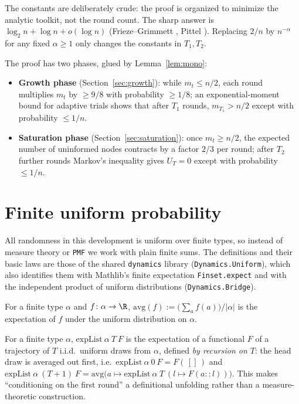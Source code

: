 \begin{remark}
  The constants are deliberately crude: the proof is organized to minimize
  the analytic toolkit, not the round count. The sharp answer is
  $\log_2 n + \log n + o(\log n)$ (Frieze--Grimmett \cite{FG85}, Pittel
  \cite{Pittel87}). Replacing $2/n$ by $n^{-\alpha}$ for any fixed
  $\alpha \ge 1$ only changes the constants in $T_1, T_2$.
\end{remark}

The proof has two phases, glued by Lemma~\ref{lem:mono}:
\begin{itemize}
\item \textbf{Growth phase} (Section~\ref{sec:growth}): while $m_t \le n/2$,
  each round multiplies $m_t$ by $\ge 9/8$ with probability $\ge 1/8$;
  an exponential-moment bound for adaptive trials shows that after $T_1$
  rounds, $m_{T_1} > n/2$ except with probability $\le 1/n$.
\item \textbf{Saturation phase} (Section~\ref{sec:saturation}): once
  $m_t \ge n/2$, the expected number of uninformed nodes contracts by a
  factor $2/3$ per round; after $T_2$ further rounds Markov's inequality
  gives $U_T = 0$ except with probability $\le 1/n$.
\end{itemize}

\section{Finite uniform probability}\label{sec:prelim}

All randomness in this development is uniform over finite types, so instead
of measure theory or \texttt{PMF} we work with plain finite sums. The
definitions and their basic laws are those of the shared \texttt{dynamics}
library (\texttt{Dynamics.Uniform}), which also identifies them with Mathlib's
finite expectation \texttt{Finset.expect} and with the independent product of
uniform distributions (\texttt{Dynamics.Bridge}).

\begin{definition}[Average]\label{def:avg}
  \leanok
  For a finite type $\alpha$ and $f \colon \alpha \to \R$,
  $\mathrm{avg}(f) := \bigl(\sum_{a} f(a)\bigr) / |\alpha|$ is the
  expectation of $f$ under the uniform distribution on $\alpha$.
\end{definition}

\begin{definition}\label{def:expList}
  \leanok
  For a finite type $\alpha$, $\mathrm{expList}\ \alpha\ T\ F$ is the
  expectation of a functional $F$ of a trajectory of $T$ i.i.d.\ uniform
  draws from $\alpha$, defined \emph{by recursion on $T$}: the head draw is
  averaged out first, i.e.\ $\mathrm{expList}\ \alpha\ 0\ F = F(\,[]\,)$ and
  $\mathrm{expList}\ \alpha\ (T{+}1)\ F
    = \mathrm{avg}\bigl(a \mapsto \mathrm{expList}\ \alpha\ T\ (l \mapsto
    F(a :: l))\bigr)$.
  This makes ``conditioning on the first round'' a definitional unfolding
  rather than a measure-theoretic construction.
\end{definition}

